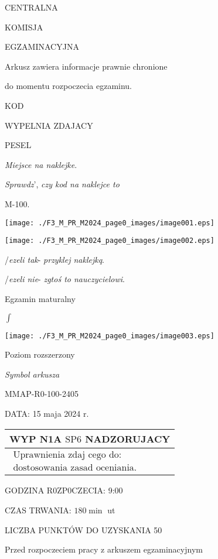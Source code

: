 \documentclass[a4paper,12pt]{article}
\begin{document}
CENTRALNA

KOMISJA

EGZAMINACYJNA

Arkusz zawiera informacje prawnie chronione

do momentu rozpoczecia egzaminu.

KOD

WYPELNIA ZDAJACY

PESEL

{\it Miejsce na naklejke}.

{\it Sprawdz}', {\it czy kod na naklejce to}

M-100.
\begin{center}
\texttt{[image: ./F3\_M\_PR\_M2024\_page0\_images/image001.eps]}

\texttt{[image: ./F3\_M\_PR\_M2024\_page0\_images/image002.eps]}
\end{center}
/{\it ezeli tak}- {\it przyklej naklejkq}.

/{\it ezeli nie}- {\it zgtoś to nauczycielowi}.

Egzamin maturalny

$\displaystyle \int$
\begin{center}
\texttt{[image: ./F3\_M\_PR\_M2024\_page0\_images/image003.eps]}
\end{center}
Poziom  rozszerzony

{\it Symbol arkusza}

MMAP-R0-100-2405

DATA: 15 maja 2024 r.
\begin{center}
\begin{tabular}{|l|}
\hline
\multicolumn{1}{|l|}{WYP N1A $\mathrm{S}\mathrm{P}6$ NADZORUJACY}	\\
\hline
\multicolumn{1}{|l|}{$\begin{array}{l}\mbox{Uprawnienia zdaj cego do:}	\\	\mbox{dostosowania zasad oceniania.}	\end{array}$}	\\
\hline
\end{tabular}

\end{center}
GODZINA R0ZP0CZECIA: 9:00

CZAS TRWANIA: $180 \displaystyle \min$ ut

LICZBA PUNKTÓW DO UZYSKANIA 50

Przed rozpoczeciem pracy z arkuszem egzaminacyjnym
\end{document}
